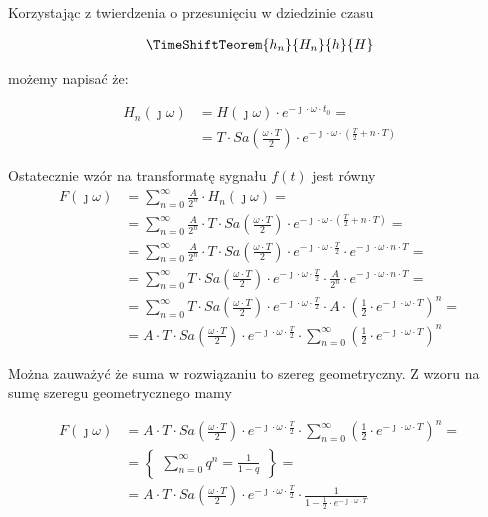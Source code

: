\begin{task}
Korzystając z twierdzenia o przesunięciu w dziedzinie czasu 

\begin{align*}
\TimeShiftTeorem{h_n}{H_n}{h}{H}
\end{align*}

możemy napisać że:

\begin{align*}
H_n(\jmath\omega) &= H(\jmath\omega) \cdot e^{-\jmath \cdot \omega \cdot t_0}=\\
&=T \cdot Sa\left(\frac{\omega \cdot T}{2}\right) \cdot e^{-\jmath \cdot \omega \cdot \left(\frac{T}{2} + n\cdot T\right)}
\end{align*}

Ostatecznie wzór na transformatę sygnału $f(t)$ jest równy 
\begin{align*}
F(\jmath\omega) &= \sum_{n=0}^{\infty}  \frac{A}{2^{n}}\cdot H_{n}(\jmath\omega)=\\
&=\sum_{n=0}^{\infty}  \frac{A}{2^{n}}\cdot T \cdot Sa\left(\frac{\omega \cdot T}{2}\right) \cdot e^{-\jmath \cdot \omega \cdot \left(\frac{T}{2} + n\cdot T\right)}=\\
&=\sum_{n=0}^{\infty}  \frac{A}{2^{n}}\cdot T \cdot Sa\left(\frac{\omega \cdot T}{2}\right) \cdot e^{-\jmath \cdot \omega \cdot \frac{T}{2}} \cdot e^{-\jmath \cdot \omega \cdot n\cdot T}=\\
&=\sum_{n=0}^{\infty} T \cdot Sa\left(\frac{\omega \cdot T}{2}\right) \cdot e^{-\jmath \cdot \omega \cdot \frac{T}{2}} \cdot  \frac{A}{2^{n}}\cdot e^{-\jmath \cdot \omega \cdot n\cdot T}=\\
&=\sum_{n=0}^{\infty} T \cdot Sa\left(\frac{\omega \cdot T}{2}\right) \cdot e^{-\jmath \cdot \omega \cdot \frac{T}{2}} \cdot  A \cdot \left(\frac{1}{2}\cdot e^{-\jmath \cdot \omega \cdot T}\right)^n=\\
&=A \cdot T \cdot Sa\left(\frac{\omega \cdot T}{2}\right) \cdot e^{-\jmath \cdot \omega \cdot \frac{T}{2}} \cdot  \sum_{n=0}^{\infty} \left(\frac{1}{2}\cdot e^{-\jmath \cdot \omega \cdot T}\right)^n
\end{align*}

Można zauważyć że suma w rozwiązaniu to szereg geometryczny. Z wzoru na sumę szeregu geometrycznego mamy

\begin{align*}
F(\jmath\omega) &=A \cdot T \cdot Sa\left(\frac{\omega \cdot T}{2}\right) \cdot e^{-\jmath \cdot \omega \cdot \frac{T}{2}} \cdot  \sum_{n=0}^{\infty} \left(\frac{1}{2}\cdot e^{-\jmath \cdot \omega \cdot T}\right)^n=\\
&=\begin{Bmatrix}
\sum_{n=0}^{\infty}q^n = \frac{1}{1-q}
\end{Bmatrix}=\\
&=A \cdot T \cdot Sa\left(\frac{\omega \cdot T}{2}\right) \cdot e^{-\jmath \cdot \omega \cdot \frac{T}{2}} \cdot \frac{1}{1 - \frac{1}{2}\cdot e^{-\jmath \cdot \omega \cdot T}}
\end{align*}


\end{task}
